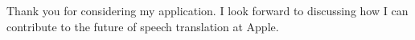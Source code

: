 \documentclass[11pt,a4paper,skipsamekey]{moderncv}
\begin{document}
	Thank you for considering my application. 
	I look forward to discussing how I can contribute to the future of speech translation at Apple.
	
	\begin{comment}
		

	My masters degree in deep learning and my recent open source project in continuous audio transcription make me an excellent candidate for the Machine Learning Research (Speech), DMLI position at Apple ML.  
	
	My thesis introduced a novel transformer-based deep learning network for prediction of multiple futures.  
	The method, which learned (unsupervised) a distribution over possible futures has potential for speech translation as well as gave me experience in deep learning toolkits and stochastic modeling.  
	
	I recently extended on an open source project (https://github.com/ros-ai/ros2\_whisper) to perform streaming audio transcription, leading to release of version 1.4 and granting me admin rights to maintain the code base.  
	Problems in solving a continuous streaming-transcription task, such as mid-word-breaks and loss of context, could be also present in a speech translation system.  
	I overcame these by holding audio data in a ring-buffer, transcribing all data in the buffer at regular intervals, and performing sub-string matching to align and update the existing transcript.  
	My solution was efficient, being coded in modern C++ with multiple threads, and offered great scalability/maintainability, using at different parts the coding paradigms of composition, inheritance, and templates.  
	While the device I chose to deploy on was an Nivida Jetson Orin, the back-end transcription network I used was Whisper CPP, which was primarily designed for Apple silicon.  
	This demonstrates my commitment to real-world product deployment, my ability to formulate problems and implement solutions, and my experience working with existing speech recognition technologies.  
	
	These two experiences prepare me for developing state-of-the art machine translation solutions at Apple.  
	From research to engineering and deployment, I would be honored to assist your talented team. 
	
	
	
	
	
	
	
	
	
	
	
	
	

\end{comment}
\end{document}
